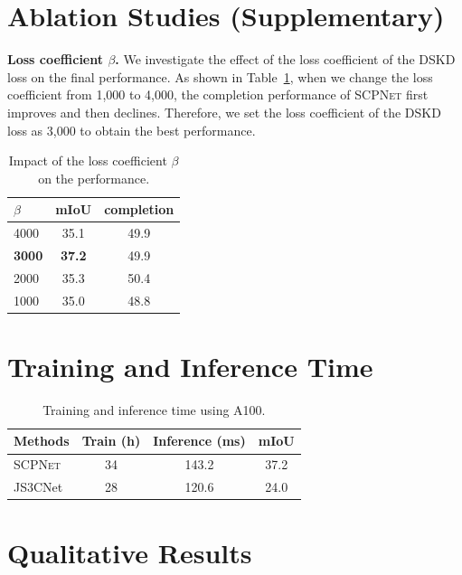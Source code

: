 \documentclass[10pt,twocolumn,letterpaper]{article}
\newcommand{\methodname}{\textsc{SCPNet}}
\begin{document}



\appendix
\section{Ablation Studies (Supplementary)}

\textbf{Loss coefficient $\beta$.}
We investigate the effect of the loss coefficient of the DSKD loss on the final performance. As shown in Table~\ref{tab:beta}, when we change the loss coefficient from 1,000 to 4,000, the completion performance of \methodname{} first improves and then declines. Therefore, we set the loss coefficient of the DSKD loss as 3,000 to obtain the best performance.

\begin{table}[htbp]
\centering
\caption{Impact of the loss coefficient $\beta$ on the performance.}
\label{tab:beta}
\begin{tabular}{lcc}
\toprule
$\beta$ & mIoU & completion \\
\midrule
4000 & 35.1 & 49.9 \\
\textbf{3000} & \textbf{37.2} & 49.9 \\
2000 & 35.3 & 50.4 \\
1000 & 35.0 & 48.8 \\
\bottomrule
\end{tabular}
\end{table}

\section{Training and Inference Time}

\begin{table}[htbp]
\centering
\caption{Training and inference time using A100.}
\label{tab:time}
\begin{tabular}{lccc}
\toprule
Methods & Train (h) & Inference (ms) & mIoU \\
\midrule
\methodname{} & 34 & 143.2 & 37.2 \\
JS3CNet      & 28 & 120.6 & 24.0 \\
\bottomrule
\end{tabular}
\end{table}

\section{Qualitative Results}
\end{document}
